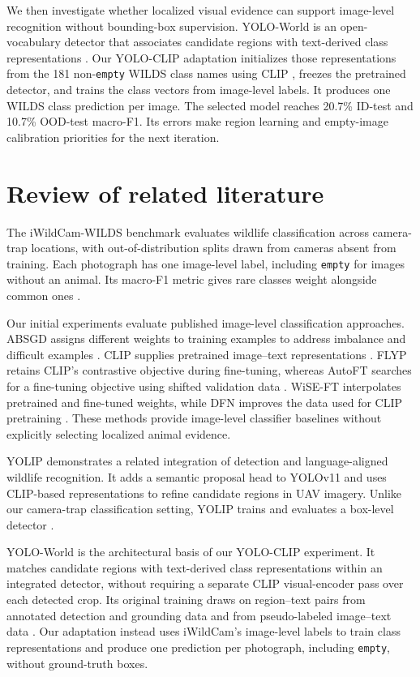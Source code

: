 \documentclass{article}
\begin{document}
We then investigate whether localized visual evidence can support image-level
recognition without bounding-box supervision. YOLO-World is an open-vocabulary
detector that associates candidate regions with text-derived class representations
\citep{cheng2024yoloworld}. Our YOLO-CLIP adaptation initializes those representations
from the 181 non-\texttt{empty} WILDS class names using CLIP \citep{radford2021learning},
freezes the pretrained detector, and trains the class vectors from image-level labels.
It produces one WILDS class prediction per image. The selected model reaches 20.7\%
ID-test and 10.7\% OOD-test macro-F1. Its errors make region learning and
empty-image calibration priorities
for the next iteration.

\section{Review of related literature}
The iWildCam-WILDS benchmark evaluates wildlife classification across camera-trap
locations, with out-of-distribution splits drawn from cameras absent from training.
Each photograph has one image-level label, including \texttt{empty} for images without
an animal. Its macro-F1 metric gives rare classes weight alongside common ones
\citep{beery2020iwildcam,pmlr-v139-koh21a}.

Our initial experiments evaluate published image-level classification approaches.
ABSGD assigns different weights to training examples to address imbalance and
difficult examples \citep{qi2023absgd}. CLIP supplies pretrained image--text
representations \citep{radford2021learning}. FLYP retains CLIP's contrastive
objective during fine-tuning, whereas AutoFT searches for a fine-tuning objective
using shifted validation data \citep{goyal2023flyp,choi2024autoft}. WiSE-FT
interpolates pretrained and fine-tuned weights, while DFN improves the data used
for CLIP pretraining \citep{wortsman2022wiseft,fang2023dfn}. These methods provide
image-level classifier baselines without explicitly selecting localized animal
evidence.

YOLIP demonstrates a related integration of detection and language-aligned wildlife
recognition. It adds a semantic proposal head to YOLOv11 and uses CLIP-based
representations to refine candidate regions in UAV imagery. Unlike our camera-trap
classification setting, YOLIP trains and evaluates a box-level detector
\citep{hu2026yolip}.

YOLO-World is the architectural basis of our YOLO-CLIP experiment. It matches
candidate regions with text-derived class representations within an integrated
detector, without requiring a separate CLIP visual-encoder pass over each detected
crop. Its original training draws on region--text pairs from annotated detection
and grounding data and from pseudo-labeled image--text data
\citep{cheng2024yoloworld}. Our adaptation instead uses iWildCam's image-level
labels to train class representations and produce one prediction per photograph,
including \texttt{empty}, without ground-truth boxes.
\end{document}
